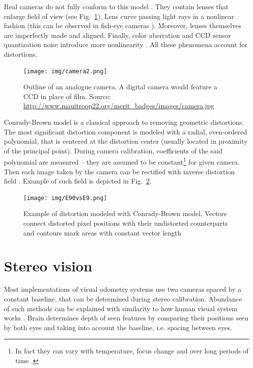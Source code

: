 Real cameras do not fully conform to this model \cite{szczesny}. They contain lenses that enlarge field of view (see Fig.~\ref{fig:analogue}). Lens curve passing light rays in a nonlinear fashion (this can be observed in fish-eye cameras \cite{fisheye_endoscopy}). Moreover, lenses themselves are imperfectly made and aligned. Finally, color aberration and CCD sensor quantization noise introduce more nonlinearity \cite{heikkla14}. All these phenomena account for distortions.

\begin{figure}[ht]
	\centering\texttt{[image: img/camera2.png]}
	\caption{Outline of an analogue camera. A digital camera would feature a CCD in place of film. Source: \url{ http://www.mauitroop22.org/merit_badges/images/camera.jpg} }
	\label{fig:analogue}
\end{figure}

Conrady-Brown model \cite{brown8} \cite{Zhang_flexible} is a classical approach to removing geometric distortions. The most significant distortion component is modeled with a radial, even-ordered polynomial, that is centered at the distortion center (usually located in proximity of the principal point). During camera calibration, coefficients of the said polynomial are measured -- they are assumed to be constant\footnote{In fact they can vary with temperature, focus change and over long periods of time \cite{google_calibration}.} for given camera. Then each image taken by the camera can be rectified with inverse distortion field \cite{opencv}. Example of such field is depicted in Fig.~\ref{fig:brown}.

\begin{figure}[ht]
	\centering\texttt{[image: img/E90vsE9.png]}
	\caption{Example of distortion modeled with Conrady-Brown model. Vectors connect distorted pixel positions with their undistorted counterparts and contours mark areas with constant vector length \cite{szczesny} }
	\label{fig:brown}
\end{figure}



\section{Stereo vision}
\label{sec:stereo}

Most implementations of visual odometry systems use two cameras spaced by a constant baseline, that can be determined during stereo calibration. Abundance of such methods can be explained with similarity to how human visual system works \cite{cyganek}. Brain determines depth of seen features by comparing their positions seen by both eyes and taking into account the baseline, i.e. spacing between eyes.

